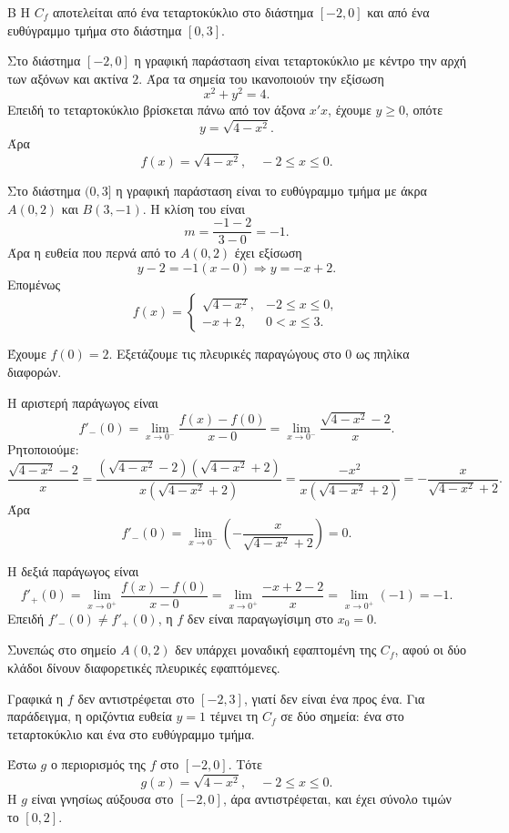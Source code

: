 
\begin{thema}{Β}
Η $C_f$ αποτελείται από ένα τεταρτοκύκλιο στο διάστημα $[-2,0]$ και από ένα ευθύγραμμο τμήμα στο διάστημα $[0,3]$.

\begin{erwthma}
\item Στο διάστημα $[-2,0]$ η γραφική παράσταση είναι τεταρτοκύκλιο με κέντρο την αρχή των αξόνων και ακτίνα $2$. Άρα τα σημεία του ικανοποιούν την εξίσωση
\[
x^2+y^2=4.
\]
Επειδή το τεταρτοκύκλιο βρίσκεται πάνω από τον άξονα $x'x$, έχουμε $y\geq 0$, οπότε
\[
y=\sqrt{4-x^2}.
\]
Άρα
\[
f(x)=\sqrt{4-x^2},\quad -2\leq x\leq 0.
\]

Στο διάστημα $(0,3]$ η γραφική παράσταση είναι το ευθύγραμμο τμήμα με άκρα $A(0,2)$ και $B(3,-1)$. Η κλίση του είναι
\[
m=\frac{-1-2}{3-0}=-1.
\]
Άρα η ευθεία που περνά από το $A(0,2)$ έχει εξίσωση
\[
y-2=-1(x-0)\Rightarrow y=-x+2.
\]
Επομένως
\[
f(x)=
\begin{cases}
\sqrt{4-x^2}, & -2\leq x\leq 0,\\
-x+2, & 0<x\leq 3.
\end{cases}
\]

\item Έχουμε $f(0)=2$. Εξετάζουμε τις πλευρικές παραγώγους στο $0$ ως πηλίκα διαφορών.

Η αριστερή παράγωγος είναι
\[
f'_-(0)=\lim_{x\to 0^-}\frac{f(x)-f(0)}{x-0}
=\lim_{x\to 0^-}\frac{\sqrt{4-x^2}-2}{x}.
\]
Ρητοποιούμε:
\[
\frac{\sqrt{4-x^2}-2}{x}
=\frac{(\sqrt{4-x^2}-2)(\sqrt{4-x^2}+2)}{x(\sqrt{4-x^2}+2)}
=\frac{-x^2}{x(\sqrt{4-x^2}+2)}
=-\frac{x}{\sqrt{4-x^2}+2}.
\]
Άρα
\[
f'_-(0)=\lim_{x\to 0^-}\left(-\frac{x}{\sqrt{4-x^2}+2}\right)=0.
\]

Η δεξιά παράγωγος είναι
\[
f'_+(0)=\lim_{x\to 0^+}\frac{f(x)-f(0)}{x-0}
=\lim_{x\to 0^+}\frac{-x+2-2}{x}
=\lim_{x\to 0^+}(-1)=-1.
\]
Επειδή $f'_-(0)\neq f'_+(0)$, η $f$ δεν είναι παραγωγίσιμη στο $x_0=0$.

Συνεπώς στο σημείο $A(0,2)$ δεν υπάρχει μοναδική εφαπτομένη της $C_f$, αφού οι δύο κλάδοι δίνουν διαφορετικές πλευρικές εφαπτόμενες.

\item Γραφικά η $f$ δεν αντιστρέφεται στο $[-2,3]$, γιατί δεν είναι ένα προς ένα. Για παράδειγμα, η οριζόντια ευθεία $y=1$ τέμνει τη $C_f$ σε δύο σημεία: ένα στο τεταρτοκύκλιο και ένα στο ευθύγραμμο τμήμα.

Έστω $g$ ο περιορισμός της $f$ στο $[-2,0]$. Τότε
\[
g(x)=\sqrt{4-x^2},\quad -2\leq x\leq 0.
\]
Η $g$ είναι γνησίως αύξουσα στο $[-2,0]$, άρα αντιστρέφεται, και έχει σύνολο τιμών το $[0,2]$.


\end{erwthma}
\end{thema}
